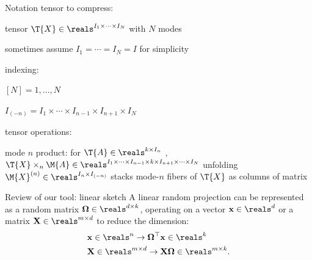 \documentclass[handout,xcolor={usenames,dvipsnames}]{beamer}
\begin{document}
\begin{frame}{Notation}
tensor to compress:
\bit
\item tensor $\T{X} \in \reals^{I_1 \times \cdots \times I_N}$ with $N$ modes
\item sometimes assume $I_1 = \cdots = I_N = I$ for simplicity
\eit

\pause indexing:
\bit
\item $[N] = 1,\ldots,N$
\item $I_{(-n)} = I_1 \times  \cdots \times  I_{n-1} \times   I_{n+1} \times I_N$
\eit

\pause tensor operations:
\bit
\item mode $n$ product: for $\T{A} \in \reals^{k \times I_n}$ ,
$\T{X} \times_n \M{A} \in \reals^{I_1 \times \cdots \times I_{n-1} \times k \times I_{n+1} \times \cdots \times I_N}$ %
\pitem unfolding $\M{X}^{(n)} \in \reals^{I_n \times I_{(-n)}}$ stacks mode-$n$ fibers of $\T{X}$ as columns of matrix
\eit
\end{frame}

\begin{frame}{Review of our tool: linear sketch}
A linear random projection can be represented as a random matrix $\mathbf{\Omega}\in \reals^{d\times k}$, operating on a vector $\mathbf{x}\in \reals^{d}$ or a matrix $\mathbf{X} \in \reals^{m\times d}$ to reduce the dimension:
\begin{equation}
\label{eq:low_dim_mapping}
\begin{aligned}
&\mathbf{x} \in \reals^{n} \rightarrow  \mathbf{\Omega}^\top \mathbf{x} \in \reals^{k} \\
& \mathbf{X} \in \reals^{m\times d} \rightarrow   \mathbf{X}\mathbf{\Omega} \in \reals^{m\times k}. 
\end{aligned}
\end{equation}
\end{frame}
\end{document}
